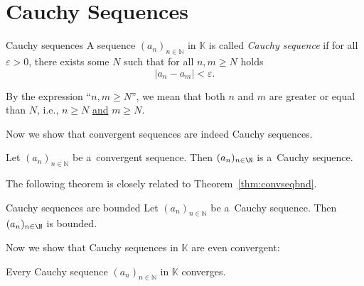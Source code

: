 \section{Cauchy Sequences}
\begin{Definition}{Cauchy sequences}
A sequence $(a_n)_{n\in\mathbb{N}}$ in $\mathbb{K}$ is called \textit{Cauchy sequence} if for all $\varepsilon>0$, there exists some $N$ such that for all $n,m\geq N$ holds
\[|a_n-a_m|<\varepsilon.\]
\end{Definition}
\begin{Remark}{}
By the expression ``$n,m\geq N$'', we mean that both $n$ and $m$ are greater or equal than $N$, i.e., $n\geq N$ \underline{and} $m\geq N$.
\end{Remark}

Now we show that convergent sequences are indeed Cauchy sequences.
\begin{Theorem}{}\label{thm:convcauch}
Let $(a_n)_{n\in\mathbb{N}}$ be a~convergent sequence. Then $(a_n)_{n\in\N}$ is a~Cauchy sequence.
\end{Theorem}

The following theorem is closely related to Theorem~\ref{thm:convseqbnd}.
\begin{Theorem}{Cauchy sequences are bounded}\label{thm:cauchseqbnd}
Let $(a_n)_{n\in\mathbb{N}}$ be a~Cauchy sequence. Then $(a_n)_{n\in\N}$ is bounded.
\end{Theorem}

Now we show that Cauchy sequences in $\mathbb{K}$ are even convergent:
\begin{Theorem}{}\label{thm:Rcompl}
Every Cauchy sequence $(a_n)_{n\in\mathbb{N}}$ in $\mathbb{K}$ converges.
\end{Theorem}

